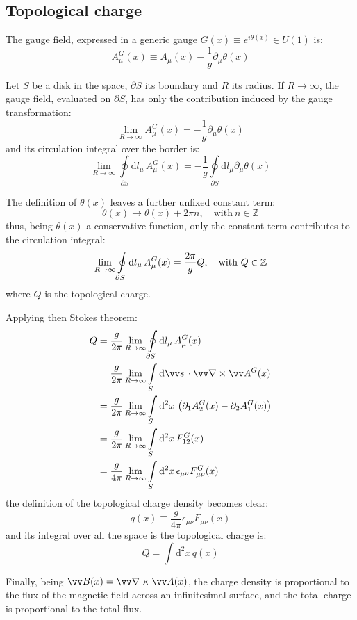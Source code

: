 \subsection*{Topological charge}

The gauge field, expressed in a generic gauge $G(x) \equiv e^{i\theta(x)} \in U(1)$ is:
\[
    A^G_\mu(x) \equiv A_\mu(x) - \frac{1}{g}\partial_\mu\theta(x)
\]

Let $S$ be a disk in the space, $\partial S$ its boundary and $R$ its radius.
If $R \to \infty$, the gauge field, evaluated on $\partial S$,
has only the contribution induced by the gauge transformation:
\[
    \lim_{R\to\infty}A^G_\mu(x) = -\frac{1}{g}\partial_\mu\theta(x)
\]
and its circulation integral over the border is:
\[
    \lim_{R\to\infty}\oint\limits_{\partial S}\mathrm dl_\mu\,A^G_\mu(x) = -\frac{1}{g}\oint\limits_{\partial S}\mathrm dl_\mu\partial_\mu\theta(x)
\]

The definition of $\theta(x)$ leaves a further unfixed constant term:
\[
    \theta(x) \rightarrow \theta(x) + 2\pi n, \quad \text{with}\ n \in \mathbb Z
\]
thus, being $\theta(x)$ a conservative function, only the constant term contributes to the circulation integral:
\[
    \lim_{R\to\infty}\oint\limits_{\partial S}\mathrm dl_\mu\,A^G_\mu(x) = \frac{2\pi}{g} Q, \quad \text{with}\ Q \in \mathbb Z \\
\]
where $Q$ is the topological charge.

Applying then Stokes theorem:
\begin{align*}
    Q &= \frac{g}{2\pi}\lim_{R\to\infty}\oint\limits_{\partial S}\mathrm dl_\mu\,A^G_\mu(x) \\
      &= \frac{g}{2\pi}\lim_{R\to\infty}\int\limits_S\mathrm d\vv s\,\cdot \vv\nabla \times \vv A^G(x) \\
      &= \frac{g}{2\pi}\lim_{R\to\infty}\int\limits_S\mathrm d^2x\, \left(\partial_1 A^G_2(x) - \partial_2 A^G_1(x)\right) \\
      &= \frac{g}{2\pi}\lim_{R\to\infty}\int\limits_S\mathrm d^2x\, F^G_{12}(x) \\
      &= \frac{g}{4\pi}\lim_{R\to\infty}\int\limits_S\mathrm d^2x\, \epsilon_{\mu\nu}F^G_{\mu\nu}(x)
\end{align*}
the definition of the topological charge density becomes clear:
\[
    q(x) \equiv \frac{g}{4\pi}\epsilon_{\mu\nu}F_{\mu\nu}(x)
\]
and its integral over all the space is the topological charge is:
\[
    Q = \int\mathrm d^2x\,q(x)
\]

Finally, being $\vv B(x) = \vv\nabla \times \vv A(x)$, the charge density is proportional to the flux of the magnetic field across an infinitesimal surface,
and the total charge is proportional to the total flux.


